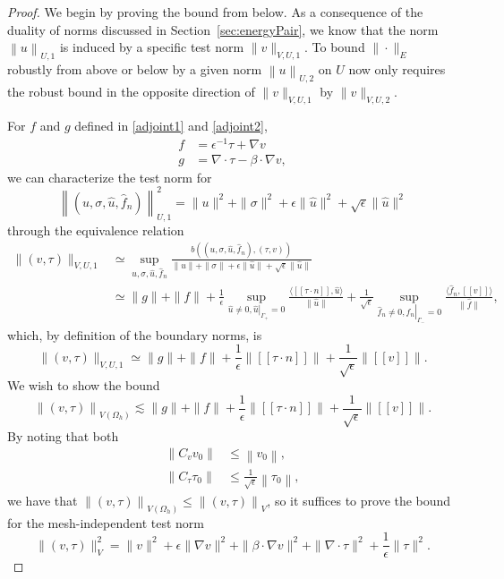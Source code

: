 \documentclass[11pt,onecolumn]{scrartcl}
\newcommand{\secref}[1]{\ref{sec:#1}}
\newcommand{\nor}[1]{\left\| #1 \right\|}
\newcommand{\LRs}[1]{\left[ #1 \right]}
\newcommand{\jump}[1] {\ensuremath{\LRs{\![#1]\!}}}
\newcommand{\Oh}{\Omega_h}
\newcommand{\grad}{\nabla}
\renewcommand{\div}{\grad \cdot}
\begin{document}
\begin{proof}
We begin by proving the bound from below. As a consequence of the duality of norms discussed in Section~\secref{energyPair}, we know that the norm $\left\| u \right\|_{U,1}$ is induced by a specific test norm $\| v  \|_{V,U,1}$.  To bound $\|\cdot\|_E$ robustly from above or below by a given norm $\left\| u \right\|_{U,2}$ on $U$ now only requires the robust bound in the opposite direction of $\| v \|_{V,U,1}$ by $\|v\|_{V,U,2}$. 

For $f$ and $g$ defined in \eqref{adjoint1} and \eqref{adjoint2},
\begin{align*}
f &= \epsilon^{-1}\tau + \grad v  \\
g &=\div \tau - \beta\cdot \grad v,
\end{align*} 
we can characterize the test norm for 
\[
\left\|\left(u,\sigma,\widehat{u},\widehat{f}_n\right)\right\|_{U,1}^2 = \|u\|^2 + \|\sigma\|^2 + \epsilon\|\widehat{u}\|^2+ \sqrt{\epsilon}\|\widehat{u}\|^2
\]
through the equivalence relation
\begin{align*}
\|\left(v,\tau\right)\|_{V,U,1} &\simeq \sup_{u,\sigma,\widehat{u},\widehat{f}_n}\frac{b\left(\left(u,\sigma,\widehat{u},\widehat{f}_n\right),\left(\tau,v\right)\right)}{\|u\| + \|\sigma\| + \epsilon\|\widehat{u}\|+ \sqrt{\epsilon}\|\widehat{u}\|}\\
& \simeq \|g\| + \|f\| + \frac{1}{\epsilon}\sup_{\widehat{u}\neq 0, \left.\widehat{u}\right|_{\Gamma_+} = 0} \frac{\langle \jump{\tau\cdot n}, \widehat{u}\rangle}{\|\widehat{u}\|} + \frac{1}{\sqrt{\epsilon}}\sup_{\widehat{f}_n\neq 0, \left.\widehat{f}_n\right|_{\Gamma_-}=0}\frac{\langle \widehat{f}_n, \jump{v}\rangle}{\|\widehat{f}\|},
\end{align*}
which, by definition of the boundary norms, is 
\[
\|\left(v,\tau\right)\|_{V,U,1} \simeq \|g\| + \|f\| + \frac{1}{\epsilon}\|\jump{\tau\cdot n}\| + \frac{1}{\sqrt{\epsilon}}\|\jump{v}\|.
\]
We wish to show the bound
\[
\nor{\left(v,\tau\right)}_{V(\Oh)} \lesssim \|g\| + \|f\| + \frac{1}{\epsilon}\|\jump{\tau\cdot n}\| + \frac{1}{\sqrt{\epsilon}}\|\jump{v}\|.
\]
By noting that both 
\begin{align*}
\nor{C_vv_0} &\leq \nor{v_0},\\
\nor{C_\tau\tau_0} &\leq \frac{1}{\sqrt{\epsilon}}\nor{\tau_0},
\end{align*}
we have that $\nor{\left(v,\tau\right)}_{V(\Oh)} \leq \nor{\left(v,\tau\right)}_{V}$, so it suffices to prove the bound for the mesh-independent test norm 
\[
\|\left(v,\tau\right)\|_{V}^2 = \|v\|^2 + \epsilon \|\grad v\|^2 + \|\beta \cdot \grad v\|^2 + \| \div \tau\|^2 + \frac{1}{\epsilon}\|\tau\|^2.
\]


\end{proof}
\end{document}
